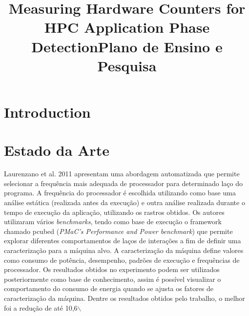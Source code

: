 \documentclass[conference,letter,10pt,final]{IEEEtran}
\date{}
\title{Measuring Hardware Counters  for HPC Application Phase Detection}
\begin{document}
\title{Plano de Ensino e Pesquisa}

\author{
}

\maketitle

\begin{abstract}

\end{abstract}

\section{Introduction}
\label{sec:orgheadline1}
\section{Estado da Arte}
\label{sec:orgheadline2}

Laurenzano et al. 2011\cite{laurenzano2011reducing} apresentam uma abordagem automatizada que permite selecionar a frequência mais adequada de processador para determinado laço do programa. A frequência do processador é escolhida utilizando como base uma análise estática (realizada antes da execução) e outra análise realizada durante o tempo de execução da aplicação, utilizando os rastros obtidos. Os autores utilizaram vários \textit{benchmarks}, tendo como base de execução o framework chamado pcubed (\textit{PMaC's Performance and Power benchmark}) que permite explorar diferentes comportamentos de laços de interações a fim de definir uma caracterização para a máquina alvo. A caracterização da máquina define valores como consumo de potência, desempenho, padrões de execução e frequências de processador. Os resultados obtidos no experimento podem ser utilizados posteriormente como base de conhecimento, assim é possível visualizar o comportamento do consumo de energia quando se ajusta os fatores de caracterização da máquina. Dentre os resultados obtidos pelo trabalho, o melhor foi a redução de até 10,6$\backslash$%
\end{document}
